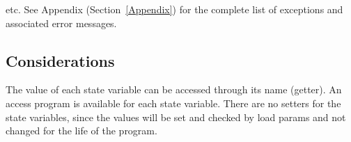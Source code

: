 \documentclass[12pt]{article}
\begin{document}
\begin{longtable*}[l]{l l}
\end{longtable*}

etc.  See Appendix (Section~\ref{Appendix}) for the complete list of exceptions and
associated error messages.

\subsection{Considerations}

The value of each state variable can be accessed through its name (getter).  An
access program is available for each state variable.  There are no setters for
the state variables, since the values will be set and checked by load params and
not changed for the life of the program.

\newpage




\end{document}
